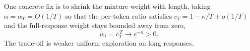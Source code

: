 \documentclass[11pt]{article}
\begin{document}
One concrete fix is to shrink the mixture weight with length, taking $\alpha=\alpha_T=O(1/T)$ so that the per-token ratio satisfies $c_T=1-\kappa/T+o(1/T)$ and the full-response weight stays bounded away from zero,
\[
    w_i=c_T^{\,T}\longrightarrow e^{-\kappa}>0 .
\]
The trade-off is weaker uniform exploration on long responses.
\end{document}
